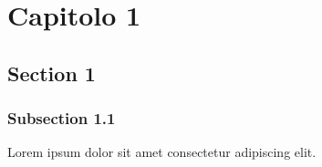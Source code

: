 \chapter{Capitolo 1}

\section{Section 1}
\subsection{Subsection 1.1}
Lorem ipsum dolor sit amet consectetur adipiscing elit.